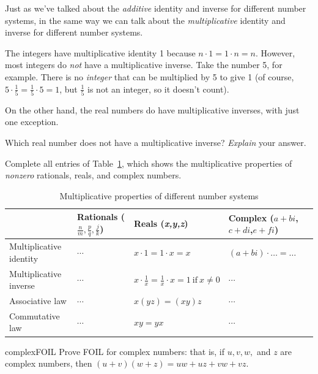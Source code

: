 Just as we've talked about the \emph{additive} identity and inverse
for different number systems, in the same way we can talk about the
\emph{multiplicative} identity and inverse for different number systems.

The integers have multiplicative identity 1 because $n\cdot1=1\cdot n=n$.
However, most integers do \emph{not} have a multiplicative inverse.
Take the number 5, for example. There is no \emph{integer} that can be multiplied by 5 to give 1 (of course, $5\cdot\frac{1}{5}=\frac{1}{5}\cdot5=1$,
but $\frac{1}{5}$ is not an integer, so it doesn't
count).

On the other hand, the real numbers do have multiplicative inverses,
with just one exception.

\begin{exercise}{14}
 Which real number does not
have a multiplicative inverse? \emph{Explain} your answer.
\end{exercise}

\begin{exercise}{15}
Complete all entries of Table~\ref{multiplicative_table}, which shows the multiplicative properties
of \emph{nonzero} rationals, reals, and complex numbers.

\begin{table}[!htb]
\caption{Multiplicative properties of different number systems}\label{multiplicative_table}
\begin{tabular}{|p{2.8cm}|p{2.0cm}|p{2.6 cm}|p{2.8cm}|}
\hline 
\rule{0pt}{2.6ex} & Rationals ($\frac{n}{m},\frac{p}{q},\frac{j}{k}$)  & Reals (\emph{x,y,z})  & Complex ($a+bi$, $c+di$,$e+fi$)\rule[-1.2ex]{0pt}{0pt}\tabularnewline
\hline
\hline 
\rule{0pt}{2.6ex} Multiplicative identity  &$\cdots$  & $x\cdot1=1\cdot x=x$  & $(a+bi)\cdot \ldots= \ldots$ \rule[-1.2ex]{0pt}{0pt} \tabularnewline
\hline 
\rule{0pt}{2.6ex} Multiplicative inverse  &  $\cdots$ & $x \cdot \frac{1}{x} = \frac{1}{x} \cdot x = 1 \mathrm{~if~} x\neq 0$  &  $\cdots$ \rule[-1.2ex]{0pt}{0pt} \tabularnewline
\hline 
\rule{0pt}{2.6ex} Associative law  & $\cdots$ & $x(yz) = (xy)z$  & $\cdots$ \rule[-1.2ex]{0pt}{0pt} \tabularnewline
\hline 
\rule{0pt}{2.6ex} Commutative law  & $\cdots$  & $xy = yx$ & $\cdots$ \rule[-1.2ex]{0pt}{0pt} \tabularnewline
\hline
\end{tabular}
\end{table}
\end{exercise}


\begin{exercise}{complexFOIL}
Prove FOIL for complex numbers: that is, if $u,v,w,$ and $z$ are complex numbers, then $(u+v)(w+z) = uw + uz+vw+vz$.
\end{exercise}

